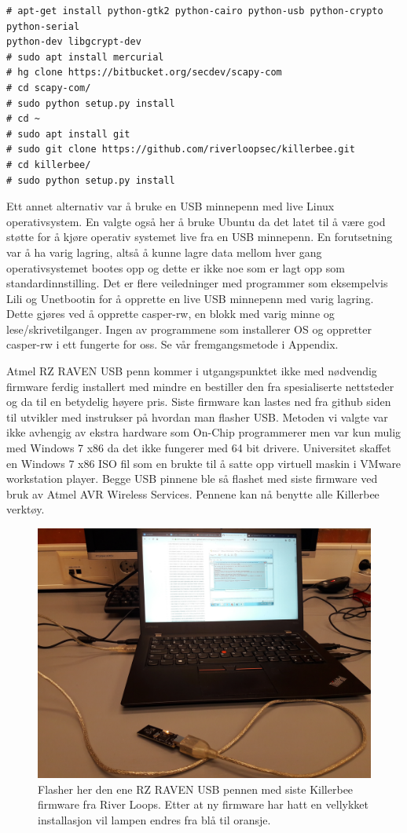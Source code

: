 \documentclass{article}
\begin{document}
\begin{verbatim}
# apt-get install python-gtk2 python-cairo python-usb python-crypto python-serial 
python-dev libgcrypt-dev
# sudo apt install mercurial
# hg clone https://bitbucket.org/secdev/scapy-com
# cd scapy-com/
# sudo python setup.py install
# cd ~
# sudo apt install git
# sudo git clone https://github.com/riverloopsec/killerbee.git
# cd killerbee/
# sudo python setup.py install
\end{verbatim}

Ett annet alternativ var å bruke en USB minnepenn med live Linux operativsystem. En valgte også her å bruke Ubuntu da det latet til å være god støtte for å kjøre operativ systemet live fra en USB minnepenn\cite{ubuntulive}. En forutsetning var å ha varig lagring, altså å kunne lagre data mellom hver gang operativsystemet bootes opp og dette er ikke noe som er lagt opp som standardinnstilling. Det er flere veiledninger med programmer som eksempelvis Lili\cite{lili} og Unetbootin\cite{unetbootin} for å opprette en live USB minnepenn med varig lagring. Dette gjøres ved å opprette casper-rw, en blokk med varig minne og lese/skrivetilganger. Ingen av programmene som installerer OS og oppretter casper-rw i ett fungerte for oss. Se vår fremgangsmetode i Appendix.


Atmel RZ RAVEN USB penn kommer i utgangspunktet ikke med nødvendig firmware ferdig installert med mindre en bestiller den fra spesialiserte nettsteder og da til en betydelig høyere pris. Siste firmware kan lastes ned fra github siden til utvikler \cite{riverloops} med instrukser på hvordan man flasher USB. Metoden vi valgte var ikke avhengig av ekstra hardware som On-Chip programmerer men var kun mulig med Windows 7 x86 da det ikke fungerer med 64 bit drivere. Universitet skaffet en Windows 7 x86 ISO fil som en brukte til å satte opp virtuell maskin i VMware workstation player. Begge USB pinnene ble så flashet med siste firmware ved bruk av Atmel AVR Wireless Services. Pennene kan nå benytte alle Killerbee verktøy. 

\begin{figure} [!ht]
	\centering
		\includegraphics[width=0.85\linewidth]{flashefw} 
\caption{Flasher her den ene RZ RAVEN USB pennen med siste Killerbee firmware fra River Loops. Etter at ny firmware har hatt en vellykket installasjon vil lampen endres fra blå til oransje.}
\end{figure}
\end{document}
